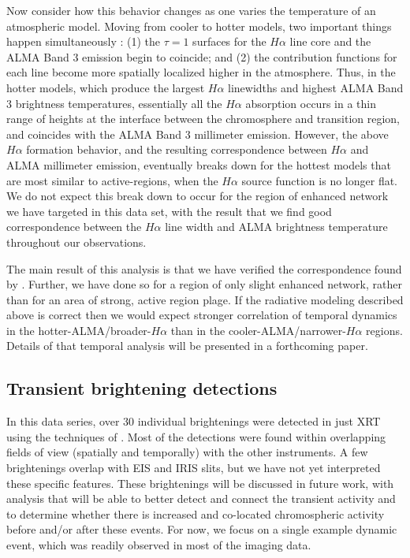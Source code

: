 \documentclass[twocolumn]{aastex62}
\newcommand{\halpha}{\ensuremath{H\alpha}}
\begin{document}
Now consider how this behavior changes as one varies the temperature of an atmospheric model.  
Moving from cooler to hotter models, two important things happen simultaneously \citep[see][Fig.~5]{2019Molnar}: (1) the $\tau=1$ surfaces for the \halpha{} line core and the ALMA Band 3 emission begin to coincide; and (2) the contribution functions for each line become more spatially localized higher in the atmosphere.
Thus, in the hotter models, which produce the largest \halpha{} linewidths and highest ALMA Band 3 brightness temperatures, essentially all the \halpha{} absorption occurs in a thin range of heights at the interface between the chromosphere and transition region, and coincides with the ALMA Band 3 millimeter emission.  
However, the above \halpha{} formation behavior, and the resulting correspondence between \halpha{} and ALMA millimeter emission, eventually breaks down for the hottest models that are most similar to active-regions, when the \halpha{} source function is no longer flat.  
We do not expect this break down to occur for the region of enhanced network we have targeted in this data set, with the result that we find good correspondence between the \halpha{} line width and ALMA brightness temperature throughout our observations.

The main result of this analysis is that we have verified the correspondence found by \citet{2019Molnar}.
Further, we have done so for a region of only slight enhanced network, rather than for an area of strong, active region plage.
If the radiative modeling described above is correct then we would expect stronger correlation of temporal dynamics in the hotter-ALMA/broader-\halpha{} than in the cooler-ALMA/narrower-\halpha{} regions.
Details of that temporal analysis will be presented in a forthcoming paper.

\subsection{Transient brightening detections}

In this data series, over 30 individual brightenings were detected in just XRT using the techniques of \citet{2014KobelskiEA_XRTTBs}. Most of the detections were found within overlapping fields of view (spatially and temporally) with the other instruments. A few brightenings overlap with EIS and IRIS slits, but we have not yet interpreted these specific features. These brightenings will be discussed in future work, with analysis that will be able to better detect and connect the transient activity and to determine whether there is increased and co-located chromospheric activity before and/or after these events. For now, we focus on a single example dynamic event, which was readily observed in most of the imaging data.  
\end{document}
